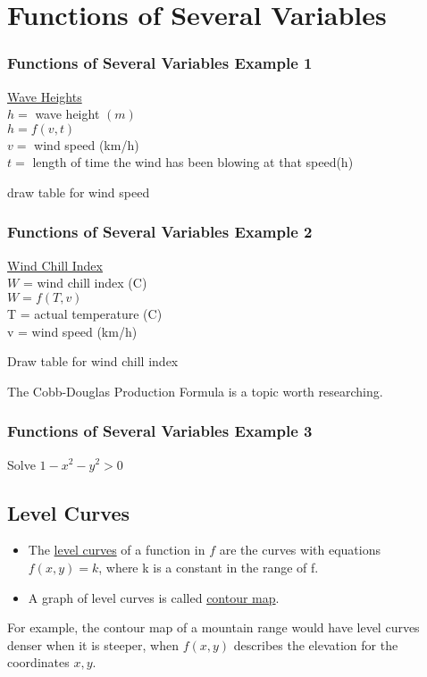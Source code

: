 \documentclass[12pt]{article}
\begin{document}
\section{Functions of Several Variables}
\subsubsection{Functions of Several Variables Example 1}
\underline{Wave Heights} \\%
\(h=\) wave height \((m)\) \\%
\(h=f(v,t)\)\\%
\( v=\) wind speed (km/h)\\%
\(t=\) length of time the wind has been blowing at that speed(h)

draw table for wind speed

\subsubsection{Functions of Several Variables Example 2}
\underline{Wind Chill Index}\\%
\(W\) = wind chill index (C)\\%
\(W = f(T,v)\) \\%
T = actual temperature (C)\\%
v = wind speed (km/h)

Draw table for wind chill index

The Cobb-Douglas Production Formula is a topic worth researching.

\subsubsection{Functions of Several Variables Example 3}
Solve \(1-x^2-y^2> 0\) 

\subsection{Level Curves}
\begin{itemize}
	\item The \underline{level curves} of a function in \(f\) are the curves with equations \\ \(f(x,y)=k\), where k is a constant in the range of f. 
	\item A graph of level curves is called \underline{contour map}.
\end{itemize}

For example, the contour map of a mountain range would have level curves denser when it is steeper, when \(f(x,y)\) describes the elevation for the coordinates \(x,y\).
\end{document}
